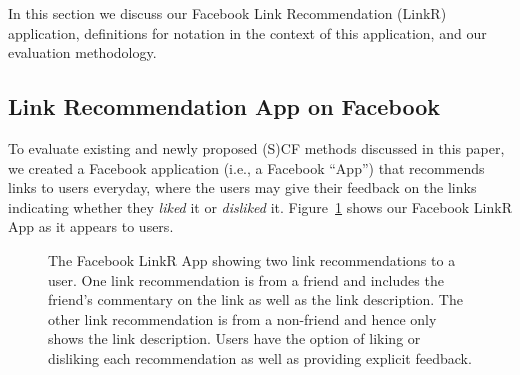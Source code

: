 In this section we discuss our Facebook Link Recommendation
(LinkR) application, definitions for 
notation in the context of this application, and our evaluation
methodology.

\subsection{Link Recommendation App on Facebook}

To evaluate existing and newly proposed (S)CF methods discussed in
this paper, we created a Facebook application (i.e., a Facebook
``App'') that recommends links to users everyday, where the users may
give their feedback on the links indicating whether they \emph{liked}
it or \emph{disliked} it.  Figure~\ref{fig:linkr_app} shows 
our Facebook LinkR App as it appears to users.

\begin{figure}[t!]
\hspace{-2mm} 
\caption{The Facebook LinkR App showing two link recommendations to a 
user.  One link recommendation is from a friend and includes the
friend's commentary on the link as well as the link description.  The
other link recommendation is from a non-friend and hence only shows
the link description.  Users have the option of liking or disliking each 
recommendation as well as providing explicit feedback.}
\label{fig:linkr_app}
\end{figure}

